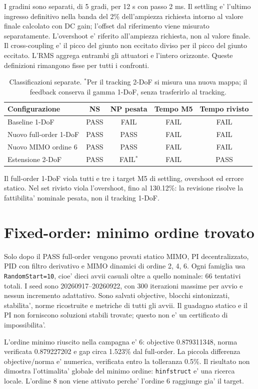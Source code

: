 I gradini sono separati, di 5 gradi, per 12 s con passo 2 ms.
Il settling e' l'ultimo ingresso definitivo nella banda del 2\%
dell'ampiezza richiesta intorno al valore finale calcolato con DC gain;
l'offset dal riferimento viene misurato separatamente.
L'overshoot e' riferito all'ampiezza richiesta, non al valore finale.
Il cross-coupling e' il picco del giunto non eccitato diviso per il picco
del giunto eccitato. L'RMS aggrega entrambi gli attuatori e l'intero orizzonte.
Queste definizioni rimangono fisse per tutti i confronti.

\begin{table}[htbp]\centering\small
\begin{tabular}{lcccc}\toprule
Configurazione & NS & NP pesata & Tempo M5 & Tempo rivisto\\\midrule
Baseline 1-DoF & PASS & FAIL & FAIL & FAIL\\
Nuovo full-order 1-DoF & PASS & PASS & FAIL & FAIL\\
Nuovo MIMO ordine 6 & PASS & PASS & FAIL & FAIL\\
Estensione 2-DoF & PASS & FAIL$^*$ & FAIL & PASS\\\bottomrule
\end{tabular}
\caption{Classificazioni separate. $^*$Per il tracking 2-DoF si misura una nuova
mappa; il feedback conserva il gamma 1-DoF, senza trasferirlo al tracking.}
\end{table}
Il full-order 1-DoF viola tutti e tre i target M5 di settling, overshoot
ed errore statico. Nel set rivisto viola l'overshoot, fino al 130.12\%:
la revisione risolve la fattibilita' nominale pesata, non il tracking 1-DoF.

\section{Fixed-order: minimo ordine trovato}
Solo dopo il PASS full-order vengono provati statico MIMO, PI
decentralizzato, PID con filtro derivativo e MIMO dinamici di ordine 2, 4, 6.
Ogni famiglia usa \texttt{RandomStart=10}, cioe' dieci avvii casuali
oltre a quello nominale: 66 tentativi totali. I seed sono 20260917--20260922,
con 300 iterazioni massime per avvio e nessun incremento adattativo.
Sono salvati objective, blocchi sintonizzati, stabilita', norme ricostruite
e metriche di tutti gli avvii. Il guadagno statico e il PI non forniscono
soluzioni stabili trovate; questo non e' un certificato di impossibilita'.

L'ordine minimo riuscito nella campagna e' 6: objective 0.879311348,
norma verificata 0.879227202 e gap circa 1.523\% dal full-order.
La piccola differenza objective/norma e' numerica, verificata entro
la tolleranza 0.5\%. Il risultato non dimostra l'ottimalita' globale
del minimo ordine: \texttt{hinfstruct} e' una ricerca locale.
L'ordine 8 non viene attivato perche' l'ordine 6 raggiunge gia' il target.

